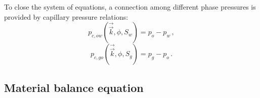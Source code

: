\documentclass[final,authoryear,5p,times,twocolumn,10pt]{elsarticle}
\begin{document}
To close the system of equations, a connection among different phase pressures is provided by capillary pressure relations:
\begin{equation}\label{eq: capillary_ow}
p_{c,ow}\left(\vec{\vec{k}},\phi,S_w\right)=p_o-p_w \, ,
\end{equation}
\begin{equation}\label{eq: capillary_og}
p_{c,go}\left(\vec{\vec{k}},\phi,S_g\right)=p_g-p_o \, .
\end{equation}



%
%
%


\subsection{Material balance equation}
\end{document}
